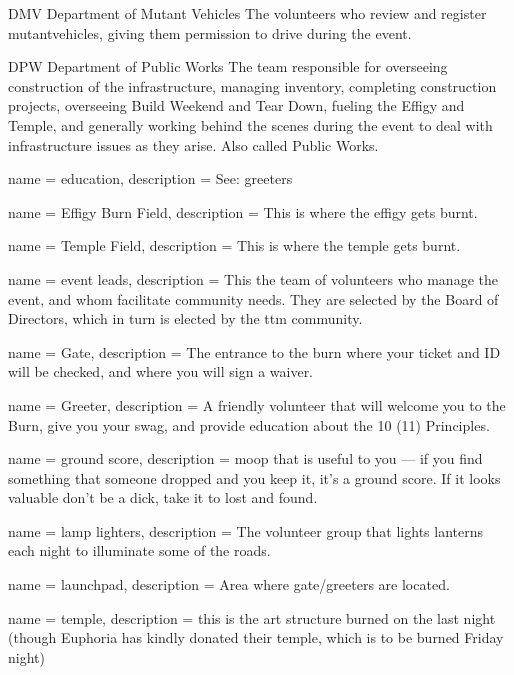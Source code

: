 {DMV}
{Department of Mutant Vehicles}
{The volunteers who review and register \gls{mutantvehicles}, giving them permission to drive during the event.}


{DPW}
{Department of Public Works}
{The team responsible for overseeing construction of the infrastructure, managing inventory, completing construction projects, overseeing Build Weekend and Tear Down, fueling the Effigy and Temple, and generally working behind the scenes during the event to deal with infrastructure issues as they arise. Also called Public Works.}

 {
name = {education},
description = {See: \glspl{greeter}}
}

 {
name = {Effigy Burn Field},
description = {This is where the effigy gets burnt.}
}

 {
name = {Temple Field},
description = {This is where the temple gets burnt.}
}

 {
name = {event leads},
description = {This the team of volunteers who manage the event, and whom facilitate community needs. They are selected by the Board of Directors, which in turn is elected by the \gls{ttm} community.}
}

 {
name = {Gate},
description = {The entrance to the burn where your ticket and ID will be checked, and where you will sign a waiver.}
}

 {
name = {Greeter},
description = {A friendly volunteer that will welcome you to the Burn, give you your \gls{swag}, and provide \gls{education} about the 10 (11) Principles. }
}

 {
name = {ground score},
description = {\gls{moop} that is useful to you --- if you find something that someone dropped and you keep it, it's a ground score. If it looks valuable don’t be a dick, take it to lost and found. }
}

 {
name = {lamp lighters},
description = {The volunteer group that lights lanterns each night to illuminate some of the roads.}
}

 {
name = {launchpad},
description = {Area where \gls{gate}/\glspl{greeter} are located.}
}

 {
name = {temple},
description = {this is the art structure burned on the last night (though Euphoria has kindly donated their temple, which is to be burned Friday night)}
}

